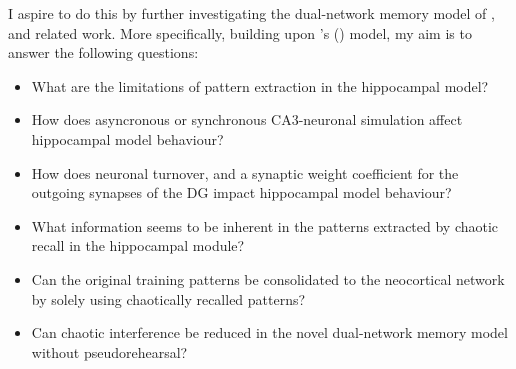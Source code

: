I aspire to do this by further investigating the dual-network memory model of \citep{Hattori2014}, and related work.
More specifically, building upon \citeauthor{Hattori2014}'s (\citeyear{Hattori2014}) model, my aim is to answer the following questions:

\begin{itemize}
    \item What are the limitations of pattern extraction in the hippocampal model?
    \item How does asyncronous or synchronous CA3-neuronal simulation affect hippocampal model behaviour?
    \item How does neuronal turnover, and a synaptic weight coefficient for the outgoing synapses of the DG impact hippocampal model behaviour?
    \item What information seems to be inherent in the patterns extracted by chaotic recall in the hippocampal module?
    \item Can the original training patterns be consolidated to the neocortical network by solely using chaotically recalled patterns?
    \item Can chaotic interference be reduced in the novel dual-network memory model without pseudorehearsal?
\end{itemize}

